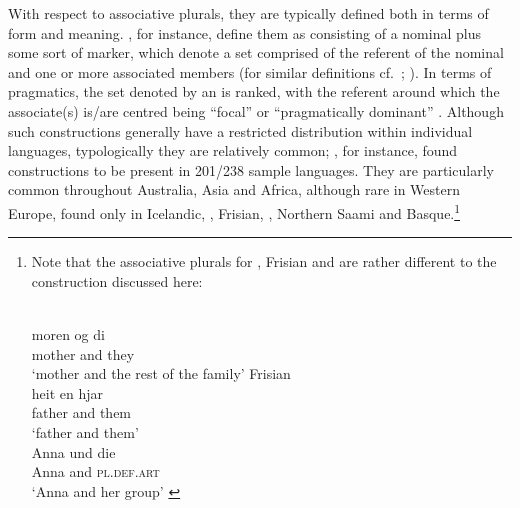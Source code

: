 \documentclass[output=paper,colorlinks,citecolor=brown]{langscibook}
\begin{document}
With respect to associative plurals, they are typically defined both in terms of form and meaning. \citet[1]{corbett1996associative}, for instance, define them as consisting of a nominal plus some sort of marker, which denote a set comprised of the referent of the nominal and one or more associated members (for similar definitions cf.~\citealp{moravcsik2003semantic}; \citealp{lewis2022associative}). %
In terms of pragmatics, the set denoted by an  is ranked, with the referent around which the associate(s) is/are centred being ``focal'' \citep{moravcsik2003semantic} or ``pragmatically dominant'' \citep{wals-36}. Although such constructions generally have a restricted distribution within individual languages, typologically they are relatively common; \citet{wals-36}, for instance, found  constructions to be present in 201/238 sample languages. They are particularly common throughout Australia, Asia and Africa, although rare in Western Europe, found only in Icelandic, , Frisian, , Northern Saami and Basque.\footnote{Note that the associative plurals for , Frisian and  are rather different to the  construction discussed here:

\ea 
\ea {}\\
\gll moren og di\\
mother and they\\
\glt `mother and the rest of the family' \citep[Sentence igt-1209]{wals-36}
\ex Frisian\\
\gll heit en hjar\\
father and them\\
\glt `father and them' \citep[Sentence igt-3403]{wals-36}
\newpage
\ex {}\\
\gll Anna und die\\
Anna and \textsc{pl.def.art}\\
\glt `Anna and her group' \citep[Sentence igt-3235]{wals-36}
\z 
\z

}
\end{document}
